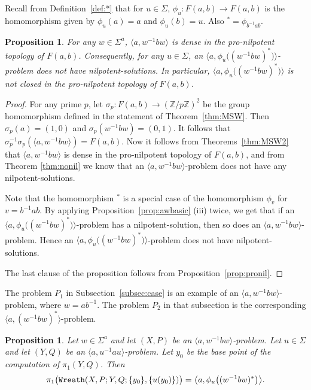 \documentclass[10pt,a4paper]{amsart}
\newtheorem{proposition}[theorem]{Proposition}
\theoremstyle{definition}
\theoremstyle{definition}
\numberwithin{equation}{section}
\begin{document}
Recall from Definition~\ref{def:*} that for $u\in \Sigma$, $\phi_u\colon F(a, b)\to F(a, b)$ is the homomorphism given by $\phi_u(a)=a$ and $\phi_u(b)=u$. Also ${}^*=\phi_{b^{-1}ab}$.

\begin{proposition}\label{prop:stationary} For any $w\in \Sigma^a$, $\langle a, w^{-1}bw\rangle$ is dense in the pro-nilpotent topology of $F(a, b)$. Consequently, for any $u\in \Sigma$, an $\big\langle a, \phi_u\big((w^{-1}bw)^*\big)\big\rangle$-problem does not have nilpotent-solutions. In particular, $\big\langle a, \phi_u\big((w^{-1}bw)^*\big)\big\rangle$ is not closed in the pro-nilpotent topology of $F(a, b)$. 
\end{proposition}

\begin{proof} For any prime $p$, let $\sigma_p\colon F(a, b)\to (\mathbb{Z}/p\mathbb{Z})^2$ be the group homomorphism defined in the statement of Theorem~\ref{thm:MSW}. Then $\sigma_p(a)=(1,0)$ and $\sigma_p(w^{-1}bw)=(0,1)$. It follows that $\sigma_p^{-1}\sigma_p(\langle a, w^{-1}bw\rangle)=F(a, b)$. Now it follows from Theorems~\ref{thm:MSW2} that $\langle a, w^{-1}bw\rangle$ is dense in the pro-nilpotent topology of $F(a, b)$, and from Theorem \ref{thm:nonil} we know that an $\langle a, w^{-1}bw\rangle$-problem does not have any nilpotent-solutions.

Note that the homomorphism ${}^*$ is a special case of the homomorphism $\phi_v$ for $v=b^{-1}ab$. By applying Proposition~\ref{prop:awbasic} (iii) twice, we get that if an $\big\langle a, \phi_u\big((w^{-1}bw)^*\big)\big\rangle$-problem has a nilpotent-solution, then so does an $\langle a, w^{-1}bw\rangle$-problem. Hence an $\big\langle a, \phi_u\big((w^{-1}bw)^*\big)\big\rangle$-problem does not have nilpotent-solutions. 

The last clause of the proposition follows from Proposition~\ref{prop:pronil}.
\end{proof}

The problem $P_1$ in Subsection~\ref{subsec:case} is an example of an $\langle a, w^{-1}bw\rangle$-problem, where $w=ab^{-1}$. The problem $P_2$ in that subsection is the corresponding $\langle a, (w^{-1}bw)^*\rangle$-problem.


\begin{proposition}\label{prop:wrsolution} Let $w\in \Sigma^a$ and let $(X, P)$ be an $\langle a, w^{-1}bw\rangle$-problem. Let $u\in \Sigma$ and let $(Y, Q)$ be an $\langle a, u^{-1}au\rangle$-problem. Let $y_0$ be the base point of the computation of $\pi_1(Y, Q)$. Then 
$$\pi_1\big(\mbox{\tt Wreath}(X,P; Y, Q; \{y_0\}, \{u(y_0)\})\big)=
\big\langle a, \phi_u\big((w^{-1}bw)^*\big)\big\rangle. $$
\end{proposition}
\end{document}

